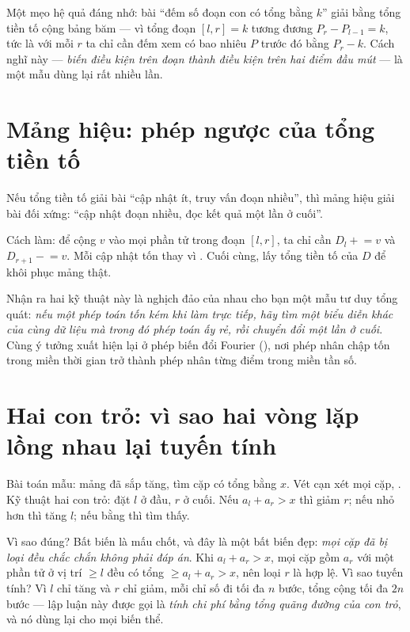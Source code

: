 \documentclass[../../algorithm.tex]{subfiles}
\begin{document}
Một mẹo hệ quả đáng nhớ: bài ``đếm số đoạn con có tổng bằng \(k\)'' giải bằng tổng tiền tố cộng bảng băm --- vì tổng đoạn \([l,r] = k\) tương đương \(P_r - P_{l-1} = k\), tức là với mỗi \(r\) ta chỉ cần đếm xem có bao nhiêu \(P\) trước đó bằng \(P_r - k\). Cách nghĩ này --- \emph{biến điều kiện trên đoạn thành điều kiện trên hai điểm đầu mút} --- là một mẫu dùng lại rất nhiều lần.

\section{Mảng hiệu: phép ngược của tổng tiền tố}

Nếu tổng tiền tố giải bài ``cập nhật ít, truy vấn đoạn nhiều'', thì mảng hiệu giải bài đối xứng: ``cập nhật đoạn nhiều, đọc kết quả một lần ở cuối''.

Cách làm: để cộng \(v\) vào mọi phần tử trong đoạn \([l,r]\), ta chỉ cần \(D_l \mathrel{+}= v\) và \(D_{r+1} \mathrel{-}= v\). Mỗi cập nhật tốn  thay vì . Cuối cùng, lấy tổng tiền tố của \(D\) để khôi phục mảng thật.

Nhận ra hai kỹ thuật này là nghịch đảo của nhau cho bạn một mẫu tư duy tổng quát: \emph{nếu một phép toán tốn kém khi làm trực tiếp, hãy tìm một biểu diễn khác của cùng dữ liệu mà trong đó phép toán ấy rẻ, rồi chuyển đổi một lần ở cuối}. Cùng ý tưởng xuất hiện lại ở phép biến đổi Fourier (), nơi phép nhân chập tốn  trong miền thời gian trở thành phép nhân từng điểm  trong miền tần số.

\section{Hai con trỏ: vì sao hai vòng lặp lồng nhau lại tuyến tính}

Bài toán mẫu: mảng đã sắp tăng, tìm cặp có tổng bằng \(x\). Vét cạn xét mọi cặp, . Kỹ thuật hai con trỏ: đặt \(l\) ở đầu, \(r\) ở cuối. Nếu \(a_l + a_r > x\) thì giảm \(r\); nếu nhỏ hơn thì tăng \(l\); nếu bằng thì tìm thấy.

Vì sao đúng? Bất biến là mấu chốt, và đây là một bất biến đẹp: \emph{mọi cặp đã bị loại đều chắc chắn không phải đáp án}. Khi \(a_l + a_r > x\), mọi cặp gồm \(a_r\) với một phần tử ở vị trí \(\ge l\) đều có tổng \(\ge a_l + a_r > x\), nên loại \(r\) là hợp lệ. Vì sao tuyến tính? Vì \(l\) chỉ tăng và \(r\) chỉ giảm, mỗi chỉ số đi tối đa \(n\) bước, tổng cộng tối đa \(2n\) bước --- lập luận này được gọi là \emph{tính chi phí bằng tổng quãng đường của con trỏ}, và nó dùng lại cho mọi biến thể.
\end{document}
